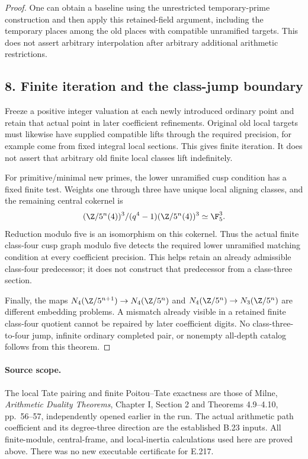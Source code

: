 \begin{proof}
One can obtain a baseline using the unrestricted temporary-prime construction and then apply this retained-field argument, including the temporary places among the old places with compatible unramified targets. This does not assert arbitrary interpolation after arbitrary additional arithmetic restrictions.

\subsection*{8. Finite iteration and the class-jump boundary}
Freeze a positive integer valuation at each newly introduced ordinary point and retain that actual point in later coefficient refinements. Original old local targets must likewise have supplied compatible lifts through the required precision, for example come from fixed integral local sections. This gives finite iteration. It does not assert that arbitrary old finite local classes lift indefinitely.

For primitive/minimal new primes, the lower unramified cusp condition has a fixed finite test. Weights one through three have unique local aligning classes, and the remaining central cokernel is
\[
 (\Z/5^n(4))^3/(q^4-1)(\Z/5^n(4))^3\simeq\F_5^3.
\]
Reduction modulo five is an isomorphism on this cokernel. Thus the actual finite class-four cusp graph modulo five detects the required lower unramified matching condition at every coefficient precision. This helps retain an already admissible class-four predecessor; it does not construct that predecessor from a class-three section.

Finally, the maps $N_4(\Z/5^{n+1})\to N_4(\Z/5^n)$ and $N_4(\Z/5^n)\to N_3(\Z/5^n)$ are different embedding problems. A mismatch already visible in a retained finite class-four quotient cannot be repaired by later coefficient digits. No class-three-to-four jump, infinite ordinary completed pair, or nonempty all-depth catalog follows from this theorem.
\end{proof}

\paragraph{Source scope.}
The local Tate pairing and finite Poitou--Tate exactness are those of Milne, \emph{Arithmetic Duality Theorems}, Chapter I, Section 2 and Theorems 4.9--4.10, pp.~56--57, independently opened earlier in the run. The actual arithmetic path coefficient and its degree-three direction are the established B.23 inputs. All finite-module, central-frame, and local-inertia calculations used here are proved above. There was no new executable certificate for E.217.
